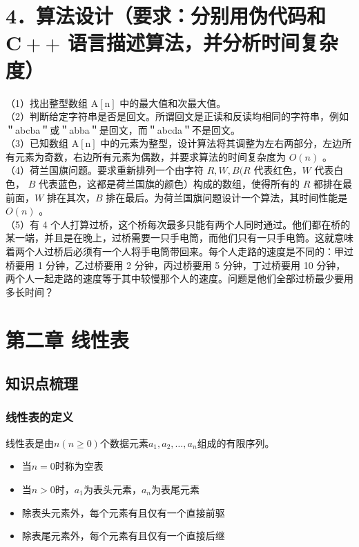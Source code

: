 \documentclass[12pt,a4paper]{amsart}
\begin{document}
\section*{4．算法设计（要求：分别用伪代码和 $\mathbf{C}++$ 语言描述算法，并分析时间复杂度）}
（1）找出整型数组 $\mathrm{A}[\mathrm{n}]$ 中的最大值和次最大值。\\
（2）判断给定字符串是否是回文。所谓回文是正读和反读均相同的字符串，例如 ＂abcba＂或＂abba＂是回文，而＂abcda＂不是回文。\\
（3）已知数组 $\mathrm{A}[\mathrm{n}]$ 中的元素为整型，设计算法将其调整为左右两部分，左边所有元素为奇数，右边所有元素为偶数，并要求算法的时间复杂度为 $O(n)$ 。\\
（4）荷兰国旗问题。要求重新排列一个由字符 $R, W, B(R$ 代表红色，$W$ 代表白色， $B$ 代表蓝色，这都是荷兰国旗的颜色）构成的数组，使得所有的 $R$ 都排在最前面，$W$ 排在其次，$B$ 排在最后。为荷兰国旗问题设计一个算法，其时间性能是 $O(n)$ 。\\
（5）有 4 个人打算过桥，这个桥每次最多只能有两个人同时通过。他们都在桥的某一端，并且是在晚上，过桥需要一只手电筒，而他们只有一只手电筒。这就意味着两个人过桥后必须有一个人将手电筒带回来。每个人走路的速度是不同的：甲过桥要用 1 分钟，乙过桥要用 2 分钟，丙过桥要用 5 分钟，丁过桥要用 10 分钟，两个人一起走路的速度等于其中较慢那个人的速度。问题是他们全部过桥最少要用多长时间？

\section{第二章 线性表}

\subsection{知识点梳理}

\subsubsection{线性表的定义}
线性表是由$n(n \geq 0)$个数据元素$a_1, a_2, \ldots, a_n$组成的有限序列。
\begin{itemize}
\item 当$n=0$时称为空表
\item 当$n>0$时，$a_1$为表头元素，$a_n$为表尾元素
\item 除表头元素外，每个元素有且仅有一个直接前驱
\item 除表尾元素外，每个元素有且仅有一个直接后继
\end{itemize}
\end{document}
